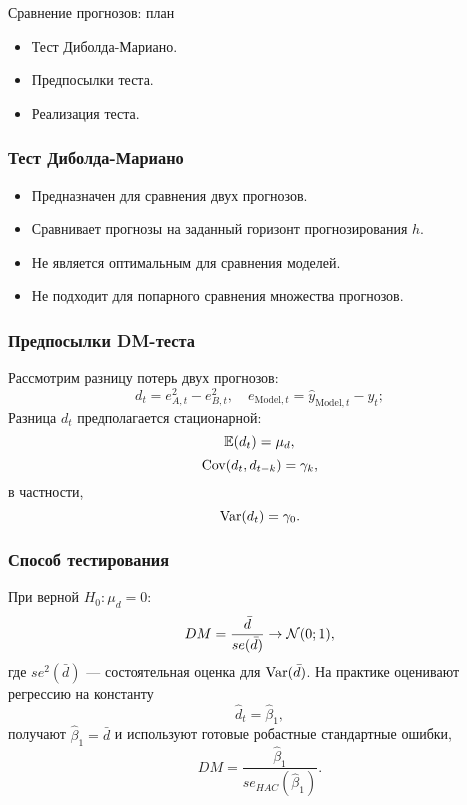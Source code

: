 
\begin{frame} %


\end{frame}



\begin{frame}{Сравнение прогнозов: план}
  \begin{itemize}[<+->]
    \item Тест Диболда-Мариано.
    \item \alert{Предпосылки} теста.
    \item Реализация теста. 
  \end{itemize}

\end{frame}

\begin{frame}
  \frametitle{Тест Диболда-Мариано}

  \begin{itemize}[<+->]
    \item Предназначен для сравнения \alert{двух} прогнозов.
    \item Сравнивает прогнозы на \alert{заданный горизонт} прогнозирования $h$.
    \item Не является оптимальным для \alert{сравнения моделей}. 
    \item Не подходит для \alert{попарного} сравнения множества прогнозов.
  \end{itemize}
  
\end{frame}

\begin{frame}
  \frametitle{Предпосылки DM-теста}

  Рассмотрим \alert{разницу потерь} двух прогнозов:
  \[
  d_t = e_{A,t}^2 - e_{B,t}^2, \quad e_{\text{Model},t} = \hat y_{\text{Model},t} - y_t;
  \]
  \pause
  Разница $d_t$ предполагается \alert{стационарной}:\pause
  \[
  \mathbb{E}(d_t) = \mu_d,
  \]
  \pause 
  \[
  \operatorname{Cov}(d_t, d_{t-k}) = \gamma_k,    
  \] \pause
  в частности,
  \[
  \operatorname{Var}(d_t) = \gamma_0.    
  \]
  
\end{frame}

\begin{frame}
    \frametitle{Способ тестирования}
    При верной $H_0: \mu_d = 0$:
    \[
       DM = \frac{\bar d}{se(\bar d)} \to \mathcal{N}(0;1),
    \]
    где $se^2(\bar d)$ — состоятельная оценка для $\operatorname{Var}(\bar d)$.
    \pause 
    На практике оценивают регрессию на константу
    \[
    \hat d_t = \hat \beta_1,
    \]
    \pause 
    получают $\hat\beta_1 = \bar d$ и используют готовые \alert{робастные стандартные ошибки},
    \[
        DM = \frac{\hat \beta_1}{se_{HAC}(\hat\beta_1)}.
    \]
\end{frame}

